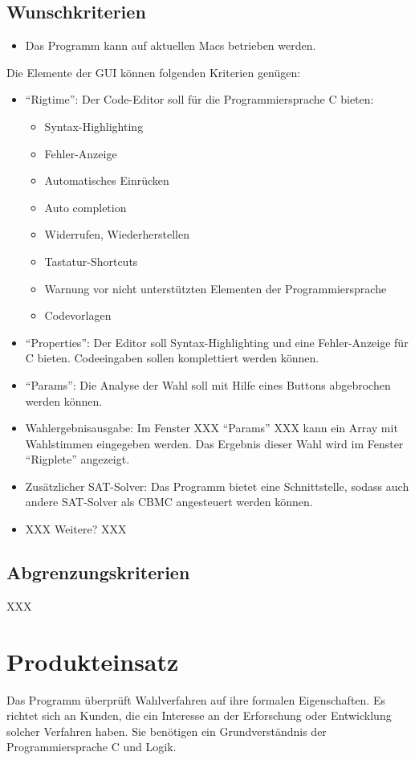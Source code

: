 \documentclass[a4paper]{scrreprt}
\begin{document}
\section{Wunschkriterien}
\begin{itemize}
\item Das Programm kann auf aktuellen Macs betrieben werden.
\end{itemize}
Die Elemente der \ac{GUI} können folgenden Kriterien genügen:
\begin{itemize}
\item "`Rigtime"': Der Code-Editor soll für die Programmiersprache C bieten:
\begin{itemize} 
\item Syntax-Highlighting \item Fehler-Anzeige \item Automatisches Einrücken \item Auto completion \item Widerrufen, Wiederherstellen \item Tastatur-Shortcuts
\item Warnung vor nicht unterstützten Elementen der Programmiersprache \item Codevorlagen
\end{itemize}
\item "`Properties"': Der Editor soll Syntax-Highlighting und eine Fehler-Anzeige für C bieten. Codeeingaben sollen komplettiert werden können.
\item "`Params"': Die Analyse der Wahl soll mit Hilfe eines Buttons abgebrochen werden können.
\item Wahlergebnisausgabe: Im Fenster XXX "`Params"' XXX kann ein Array mit Wahlstimmen eingegeben werden. Das Ergebnis dieser Wahl wird im Fenster "`Rigplete"' angezeigt.
\item Zusätzlicher SAT-Solver: Das Programm bietet eine Schnittstelle, sodass auch andere SAT-Solver als CBMC angesteuert werden können.
\item XXX Weitere? XXX
\end{itemize}

\section{Abgrenzungskriterien}
XXX


\chapter{Produkteinsatz}
Das Programm überprüft Wahlverfahren auf ihre formalen Eigenschaften. Es richtet sich an Kunden, die ein Interesse an der Erforschung oder Entwicklung solcher Verfahren haben. Sie benötigen ein Grundverständnis der Programmiersprache C und Logik.
\end{document}
